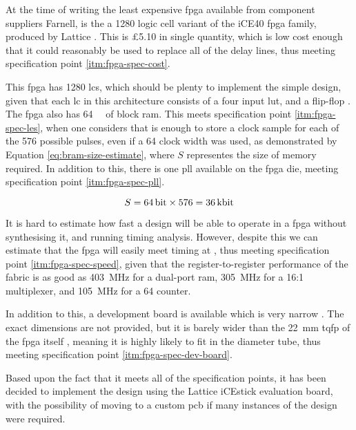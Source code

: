 At the time of writing the least expensive \gls{fpga} available from component suppliers Farnell, is the a 1280 logic cell variant of the iCE40 \gls{fpga} family, produced by Lattice \cite{farnell2017}. This is \pounds5.10 in single quantity, which is low cost enough that it could reasonably be used to replace all of the delay lines, thus meeting specification point \ref{itm:fpga-spec-cost}.

This \gls{fpga} has 1280 \glspl{lc}, which should be plenty to implement the simple design, given that each \gls{lc} in this architecture consists of a four input \gls{lut}, and a flip-flop \cite[p.2-2]{lattice2017a}. The \gls{fpga} also has \SI{64}{\kilo\bit} of block \gls{ram}. This meets specification point \ref{itm:fpga-spec-les}, when one considers that is enough to store a clock sample for each of the 576 possible pulses, even if a \SI{64}{\bit} clock width was used, as demonstrated by Equation \ref{eq:bram-size-estimate}, where $S$ representes the size of memory required. In addition to this, there is one \gls{pll} available on the \gls{fpga} die, meeting specification point \ref{itm:fpga-spec-pll}.

\begin{equation}
	S = \SI{64}{\bit} \times 576 = \SI{36}{\kilo\bit} \label{eq:bram-size-estimate}
\end{equation}

It is hard to estimate how fast a design will be able to operate in a \gls{fpga} without synthesising it, and running timing analysis. However, despite this we can estimate that the \gls{fpga} will easily meet timing at , thus meeting specification point \ref{itm:fpga-spec-speed}, given that the register-to-register performance of the fabric is as good as \SI{403}{\mega\hertz} for a dual-port \gls{ram}, \SI{305}{\mega\hertz} for a 16:1 multiplexer, and \SI{105}{\mega\hertz} for a \SI{64}{\bit} counter.

In addition to this, a development board is available which is very narrow \cite{lattice2017b}. The exact dimensions are not provided, but it is barely wider than the \SI{22}{\milli\metre} \gls{tqfp} of the \gls{fpga} itself \cite[p.2]{lattice2017b}, meaning it is highly likely to fit in the  diameter tube, thus meeting specification point \ref{itm:fpga-spec-dev-board}.

Based upon the fact that it meets all of the specification points, it has been decided to implement the design using the Lattice iCEstick evaluation board, with the possibility of moving to a custom \gls{pcb} if many instances of the design were required.

